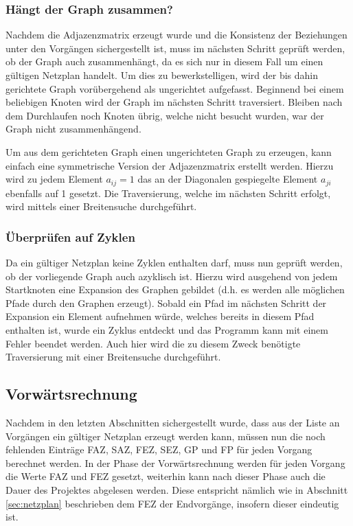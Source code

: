 \subsubsection{H\"angt der Graph zusammen?}

Nachdem die Adjazenzmatrix erzeugt wurde und die Konsistenz der
Beziehungen unter den Vorg\"angen sichergestellt ist, muss im
n\"achsten Schritt gepr\"uft werden, ob der Graph auch
zusammenh\"angt, da es sich nur in diesem Fall um einen g\"ultigen
Netzplan handelt. Um dies zu bewerkstelligen, wird der bis dahin
gerichtete Graph vor\"ubergehend als ungerichtet aufgefasst. Beginnend
bei einem beliebigen Knoten wird der Graph im n\"achsten Schritt
traversiert. Bleiben nach dem Durchlaufen noch Knoten \"ubrig, welche
nicht besucht wurden, war der Graph nicht zusammenh\"angend.

Um aus dem gerichteten Graph einen ungerichteten Graph zu erzeugen,
kann einfach eine symmetrische Version der Adjazenzmatrix erstellt
werden. Hierzu wird zu jedem Element \(a_{ij}=1\) das an der
Diagonalen gespiegelte Element \(a_{ji}\) ebenfalls auf 1 gesetzt.
Die Traversierung, welche im n\"achsten Schritt erfolgt, wird mittels
einer Breitensuche durchgef\"uhrt.

\subsubsection{\"Uberpr\"ufen auf Zyklen}

Da ein g\"ultiger Netzplan keine Zyklen enthalten darf, muss nun
gepr\"uft werden, ob der vorliegende Graph auch azyklisch ist. Hierzu
wird ausgehend von jedem Startknoten eine Expansion des Graphen
gebildet (d.h. es werden alle m\"oglichen Pfade durch den Graphen erzeugt).
Sobald ein Pfad im n\"achsten Schritt der Expansion ein Element
aufnehmen w\"urde, welches bereits in diesem Pfad enthalten ist, wurde
ein Zyklus entdeckt und das Programm kann mit einem Fehler beendet
werden. Auch hier wird die zu diesem Zweck ben\"otigte
Traversierung mit einer Breitensuche durchgef\"uhrt.

\subsection{Vorw\"artsrechnung}

Nachdem in den letzten Abschnitten sichergestellt wurde, dass aus der
Liste an Vorg\"angen ein g\"ultiger Netzplan erzeugt werden kann,
m\"ussen nun die noch fehlenden Eintr\"age FAZ, SAZ, FEZ, SEZ, GP und
FP f\"ur jeden Vorgang berechnet werden. In der Phase der
Vorw\"artsrechnung werden f\"ur jeden Vorgang die Werte FAZ und FEZ
gesetzt, weiterhin kann nach dieser Phase auch die Dauer des Projektes
abgelesen werden. Diese entspricht n\"amlich wie in Abschnitt
\ref{sec:netzplan} beschrieben dem FEZ der Endvorg\"ange, insofern
dieser eindeutig ist.

